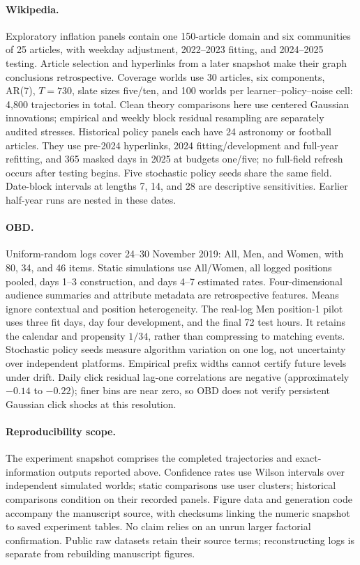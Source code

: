 \documentclass[sigconf,review,anonymous]{acmart}
\begin{document}
\paragraph{Wikipedia.} Exploratory inflation panels contain one 150-article domain and six communities of 25 articles, with weekday adjustment, 2022--2023 fitting, and 2024--2025 testing. Article selection and hyperlinks from a later snapshot make their graph conclusions retrospective. Coverage worlds use 30 articles, six components, AR(7), $T=730$, slate sizes five/ten, and 100 worlds per learner--policy--noise cell: 4,800 trajectories in total. Clean theory comparisons here use centered Gaussian innovations; empirical and weekly block residual resampling are separately audited stresses. Historical policy panels each have 24 astronomy or football articles. They use pre-2024 hyperlinks, 2024 fitting/development and full-year refitting, and 365 masked days in 2025 at budgets one/five; no full-field refresh occurs after testing begins. Five stochastic policy seeds share the same field. Date-block intervals at lengths 7, 14, and 28 are descriptive sensitivities. Earlier half-year runs are nested in these dates.

\paragraph{OBD.} Uniform-random logs cover 24--30 November 2019: All, Men, and Women, with 80, 34, and 46 items. Static simulations use All/Women, all logged positions pooled, days 1--3 construction, and days 4--7 estimated rates. Four-dimensional audience summaries and attribute metadata are retrospective features. Means ignore contextual and position heterogeneity. The real-log Men position-1 pilot uses three fit days, day four development, and the final 72 test hours. It retains the calendar and propensity $1/34$, rather than compressing to matching events. Stochastic policy seeds measure algorithm variation on one log, not uncertainty over independent platforms. Empirical prefix widths cannot certify future levels under drift. Daily click residual lag-one correlations are negative (approximately $-0.14$ to $-0.22$); finer bins are near zero, so OBD does not verify persistent Gaussian click shocks at this resolution.

\paragraph{Reproducibility scope.} The experiment snapshot comprises the completed trajectories and exact-information outputs reported above. Confidence rates use Wilson intervals over independent simulated worlds; static comparisons use user clusters; historical comparisons condition on their recorded panels. Figure data and generation code accompany the manuscript source, with checksums linking the numeric snapshot to saved experiment tables. No claim relies on an unrun larger factorial confirmation. Public raw datasets retain their source terms; reconstructing logs is separate from rebuilding manuscript figures.
\end{document}

